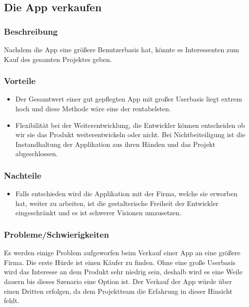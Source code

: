 \documentclass[FIPLY_base.tex]{subfiles}
\begin{document}
\subsection{Die App verkaufen}


\subsubsection{Beschreibung}
Nachdem die App eine größere Benutzerbasis hat, könnte es Interessenten zum Kauf des gesamten Projektes geben.


\subsubsection{Vorteile}
\begin{itemize}
\item Der Gesamtwert einer gut gepflegten App mit großer Userbasis liegt extrem hoch und diese Methode wäre eine der rentabelsten.
\item Flexibilität bei der Weiterentwicklung, die Entwickler können entscheiden ob wir sie das Produkt weiterentwickeln oder nicht. Bei Nichtbeiteiligung ist die Instandhaltung der Applikation aus ihren Händen und das Projekt abgeschlossen.
\end{itemize}

\subsubsection{Nachteile}
\begin{itemize}
\item Falls entschieden wird die Applikation mit der Firma, welche sie erworben hat, weiter zu arbeiten, ist die gestalterische Freiheit der Entwickler eingeschränkt und es ist schwerer Visionen umzusetzen.
\end{itemize}


\subsubsection{Probleme/Schwierigkeiten}
Es werden einige Problem aufgeworfen beim Verkauf einer App an eine größere Firma. Die erste Hürde ist einen Käufer zu finden.
Ohne eine große Userbasis wird das Interesse an dem Produkt sehr niedrig sein, deshalb wird es eine Weile dauern bis dieses Szenario eine Option ist.
Der Verkauf der App würde über einen Dritten erfolgen, da dem Projektteam die Erfahrung in dieser Hinsicht fehlt.
\end{document}
